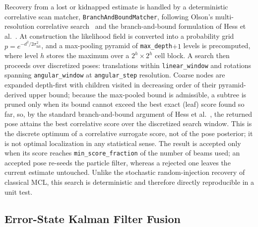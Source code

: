 Recovery from a lost or kidnapped estimate is handled by a deterministic
correlative scan matcher, \texttt{BranchAndBoundMatcher}, following Olson's
multi-resolution correlative search~\cite{olson2009correlative} and the
branch-and-bound formulation of Hess et al.~\cite{hess2016realtime}. At
construction the likelihood field is converted into a probability grid
$p = e^{-d^2/2\sigma_\mathrm{hit}^2}$, and a max-pooling pyramid of
\texttt{max\_depth}$+1$ levels is precomputed, where level $h$ stores the maximum
over a $2^h\times2^h$ cell block. A search then proceeds over discretized poses:
translations within \texttt{linear\_window} and rotations spanning
\texttt{angular\_window} at \texttt{angular\_step} resolution. Coarse nodes are
expanded depth-first with children visited in decreasing order of their
pyramid-derived upper bound; because the max-pooled bound is admissible, a
subtree is pruned only when its bound cannot exceed the best exact (leaf) score
found so far, so, by the standard branch-and-bound argument of Hess et
al.~\cite{hess2016realtime}, the returned pose attains the best correlative score
over the discretized search window. This is the discrete optimum of a
correlative surrogate score, not of the pose posterior; it is not optimal
localization in any statistical sense. The
result is accepted only when its score reaches \texttt{min\_score\_fraction} of
the number of beams used; an accepted pose re-seeds the particle filter, whereas
a rejected one leaves the current estimate untouched. Unlike the stochastic
random-injection recovery of classical MCL, this search is deterministic and
therefore directly reproducible in a unit test.

\subsection{Error-State Kalman Filter Fusion}

